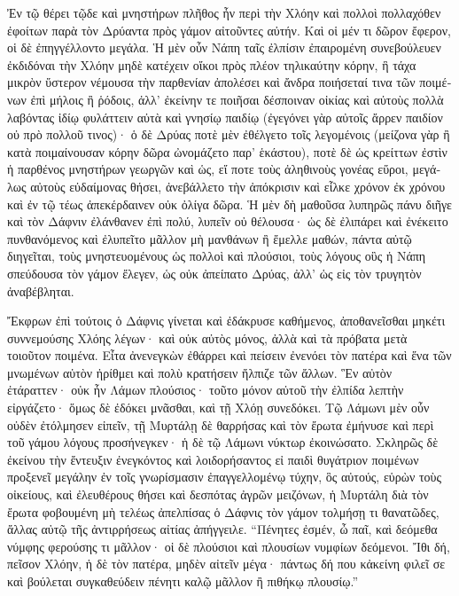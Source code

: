 \documentclass{book}
\begin{document}
\begin{pairs}
\begin{Leftside}
\begin{greek}
  Ἐν τῷ θέρει τῷδε καὶ μνηστήρων πλῆθος ἦν περὶ τὴν Χλόην καὶ πολλοὶ πολλαχόθεν ἐφοίτων παρὰ τὸν Δρύαντα πρὸς γάμον αἰτοῦντες αὐτήν. Καὶ οἱ μέν τι δῶρον ἔφερον, οἱ δὲ ἐπηγγέλλοντο μεγάλα.  Ἡ μὲν οὖν Νάπη ταῖς ἐλπίσιν ἐπαιρομένη συνεβούλευεν ἐκδιδόναι τὴν Χλόην μηδὲ κατέχειν οἴκοι πρὸς πλέον τηλικαύτην κόρην, ἣ τάχα μικρὸν ὕστερον νέμουσα τὴν παρθενίαν ἀπολέσει καὶ ἄνδρα ποιήσεταί τινα τῶν ποιμένων ἐπὶ μήλοις ἢ ῥόδοις, ἀλλ’ ἐκείνην τε ποιῆσαι δέσποιναν οἰκίας καὶ αὐτοὺς πολλὰ λαβόντας ἰδίῳ φυλάττειν αὐτὰ καὶ γνησίῳ παιδίῳ (ἐγεγόνει γὰρ αὐτοῖς ἄρρεν παιδίον οὐ πρὸ πολλοῦ τινος)·  ὁ δὲ Δρύας ποτὲ μὲν ἐθέλγετο τοῖς λεγομένοις (μείζονα γὰρ ἢ κατὰ ποιμαίνουσαν κόρην δῶρα ὠνομάζετο παρ’ ἑκάστου), ποτὲ δὲ ὡς κρείττων ἐστὶν ἡ παρθένος μνηστήρων γεωργῶν καὶ ὡς, εἴ ποτε τοὺς ἀληθινοὺς γονέας εὕροι, μεγάλως αὐτοὺς εὐδαίμονας θήσει, ἀνεβάλλετο τὴν ἀπόκρισιν καὶ εἷλκε χρόνον ἐκ χρόνου καὶ ἐν τῷ τέως ἀπεκέρδαινεν οὐκ ὀλίγα δῶρα.  Ἡ μὲν δὴ μαθοῦσα λυπηρῶς πάνυ διῆγε καὶ τὸν Δάφνιν ἐλάνθανεν ἐπὶ πολύ, λυπεῖν οὐ θέλουσα· ὡς δὲ ἐλιπάρει καὶ ἐνέκειτο πυνθανόμενος καὶ ἐλυπεῖτο μᾶλλον μὴ μανθάνων ἢ ἔμελλε μαθών, πάντα αὐτῷ διηγεῖται, τοὺς μνηστευομένους ὡς πολλοὶ καὶ πλούσιοι, τοὺς λόγους οὓς ἡ Νάπη σπεύδουσα τὸν γάμον ἔλεγεν, ὡς οὐκ ἀπείπατο Δρύας, ἀλλ’ ὡς εἰς τὸν τρυγητὸν ἀναβέβληται.
\pend


  Ἔκφρων ἐπὶ τούτοις ὁ Δάφνις γίνεται καὶ ἐδάκρυσε καθήμενος, ἀποθανεῖσθαι μηκέτι συννεμούσης Χλόης λέγων· καὶ οὐκ αὐτὸς μόνος, ἀλλὰ καὶ τὰ πρόβατα μετὰ τοιοῦτον ποιμένα. Εἶτα ἀνενεγκὼν ἐθάρρει καὶ πείσειν ἐνενόει τὸν πατέρα καὶ ἕνα τῶν μνωμένων αὑτὸν ἠρίθμει καὶ πολὺ κρατήσειν ἤλπιζε τῶν ἄλλων.  Ἓν αὐτὸν ἐτάραττεν· οὐκ ἦν Λάμων πλούσιος· τοῦτο μόνον αὐτοῦ τὴν ἐλπίδα λεπτὴν εἰργάζετο· ὅμως δὲ ἐδόκει μνᾶσθαι, καὶ τῇ Χλόῃ συνεδόκει. Τῷ Λάμωνι μὲν οὖν οὐδὲν ἐτόλμησεν εἰπεῖν, τῇ Μυρτάλῃ δὲ θαρρήσας καὶ τὸν ἔρωτα ἐμήνυσε καὶ περὶ τοῦ γάμου λόγους προσήνεγκεν· ἡ δὲ τῷ Λάμωνι νύκτωρ ἐκοινώσατο.  Σκληρῶς δὲ ἐκείνου τὴν ἔντευξιν ἐνεγκόντος καὶ λοιδορήσαντος εἰ παιδὶ θυγάτριον ποιμένων προξενεῖ μεγάλην ἐν τοῖς γνωρίσμασιν ἐπαγγελλομένῳ τύχην, ὃς αὐτούς, εὑρὼν τοὺς οἰκείους, καὶ ἐλευθέρους θήσει καὶ δεσπότας ἀγρῶν μειζόνων, ἡ Μυρτάλη διὰ τὸν ἔρωτα φοβουμένη μὴ τελέως ἀπελπίσας ὁ Δάφνις τὸν γάμον τολμήσῃ τι θανατῶδες, ἄλλας αὐτῷ τῆς ἀντιρρήσεως αἰτίας ἀπήγγειλε.  “Πένητες ἐσμέν, ὦ παῖ, καὶ δεόμεθα νύμφης φερούσης τι μᾶλλον· οἱ δὲ πλούσιοι καὶ πλουσίων νυμφίων δεόμενοι. Ἴθι δή, πεῖσον Χλόην, ἡ δὲ τὸν πατέρα, μηδὲν αἰτεῖν μέγα· πάντως δή που κἀκείνη φιλεῖ σε καὶ βούλεται συγκαθεύδειν πένητι καλῷ μᾶλλον ἢ πιθήκῳ πλουσίῳ.”
\pend



\end{greek}
\end{Leftside}
\end{pairs}
\end{document}
